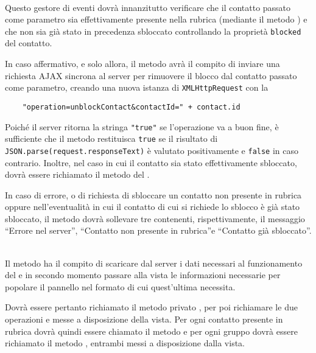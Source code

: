 \begin{description}
\item{}\\
Questo gestore di eventi dovrà innanzitutto verificare che il contatto passato come parametro sia effettivamente presente nella rubrica (mediante il metodo ) e che non sia già stato in precedenza sbloccato controllando la proprietà \verb'blocked' del contatto.

In caso affermativo, e solo allora, il metodo avrà il compito di inviare una richiesta AJAX sincrona al server per rimuovere il blocco dal contatto passato come parametro, creando una nuova istanza di \verb'XMLHttpRequest' con la 
\begin{verbatim}
    "operation=unblockContact&contactId=" + contact.id
\end{verbatim}

Poiché il server ritorna la stringa \verb'"true"' se l'operazione va a buon fine, è sufficiente che il metodo restituisca \verb'true' se il risultato di \verb'JSON.parse(request.responseText)' è valutato positivamente e \verb'false' in caso contrario. Inoltre, nel caso in cui il contatto sia stato effettivamente sbloccato, dovrà essere richiamato il metodo  del .

In caso di errore, o di richiesta di sbloccare un contatto non presente in rubrica oppure nell'eventualità in cui il contatto di cui si richiede lo sblocco è già stato sbloccato, il metodo dovrà sollevare tre  contenenti, rispettivamente, il messaggio ``Errore nel server'', ``Contatto non presente in rubrica''e ``Contatto già sbloccato''.

\item{}\\
Il metodo ha il compito di scaricare dal server i dati necessari al funzionamento del  e in secondo momento passare alla vista le informazioni necessarie per popolare il pannello nel formato di cui quest'ultima necessita.

Dovrà essere pertanto richiamato il metodo privato , per poi richiamare le due operazioni  e  messe a disposizione della vista. Per ogni contatto presente in rubrica dovrà quindi essere chiamato il metodo  e per ogni gruppo dovrà essere richiamato il metodo , entrambi messi a disposizione dalla vista.


\end{description}

